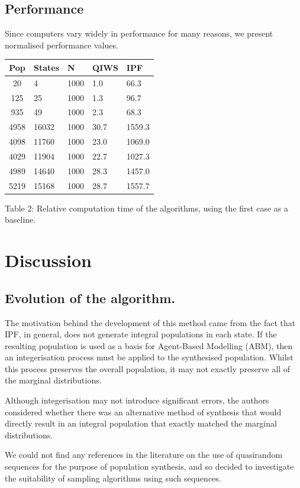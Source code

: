\documentclass[]{article}
\begin{document}
\subsection{Performance}\label{performance}

Since computers vary widely in performance for many reasons, we present
normalised performance values.

\begin{longtable}[]{@{}cllll@{}}
\toprule
Pop & States & N & QIWS & IPF\tabularnewline
\midrule
\endhead
20 & 4 & 1000 & 1.0 & 66.3\tabularnewline
125 & 25 & 1000 & 1.3 & 96.7\tabularnewline
935 & 49 & 1000 & 2.3 & 68.3\tabularnewline
4958 & 16032 & 1000 & 30.7 & 1559.3\tabularnewline
4098 & 11760 & 1000 & 23.0 & 1069.0\tabularnewline
4029 & 11904 & 1000 & 22.7 & 1027.3\tabularnewline
4989 & 14640 & 1000 & 28.3 & 1457.0\tabularnewline
5219 & 15168 & 1000 & 28.7 & 1557.7\tabularnewline
\bottomrule
\end{longtable}

Table 2: Relative computation time of the algorithms, using the first
case as a baseline.

\section{Discussion}\label{discussion}

\subsection{Evolution of the
algorithm.}\label{evolution-of-the-algorithm.}

The motivation behind the development of this method came from the fact
that IPF, in general, does not generate integral populations in each
state. If the resulting population is used as a basis for Agent-Based
Modelling (ABM), then an integerisation process must be applied to the
synthesised population. Whilst this process preserves the overall
population, it may not exactly preserve all of the marginal
distributions.

Although integerisation may not introduce significant errors, the
authors considered whether there was an alternative method of synthesis
that would directly result in an integral population that exactly
matched the marginal distributions.

We could not find any references in the literature on the use of
quasirandom sequences for the purpose of population synthesis, and so
decided to investigate the suitability of sampling algorithms using such
sequences.
\end{document}
